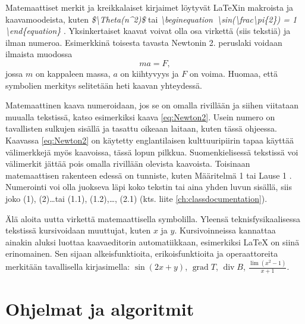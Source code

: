 \documentclass[globalnumbering,centeredcaptions,draftfooter]{tutthesis/tutthesis} %
\begin{document}
Matemaattiset merkit ja kreikkalaiset kirjaimet löytyvät LaTeXin makroista ja kaavamoodeista, kuten
\emph{\$\textbackslash Theta(n\textasciicircum2)\$}
tai
\emph{\textbackslash begin\textbraceleft equation\textbraceright\ \textbackslash sin(\textbackslash frac\textbraceleft \textbackslash pi\textbraceright\{2\}) = 1 \textbackslash end\{equation\}}
.
Yksinkertaiset kaavat voivat olla osa virkettä (siis tekstiä) ja ilman numeroa.
Esimerkkinä toisesta tavasta Newtonin 2. peruslaki voidaan ilmaista muodossa
\begin{equation} %
\label{eq:Newton2} ma = F,
\end{equation} %
jossa $m$ on kappaleen massa, $a$ on kiihtyvyys ja $F$ on voima.
Huomaa, että symbolien merkitys selitetään heti kaavan yhteydessä.


Matemaattinen kaava numeroidaan, jos se on omalla rivillään ja siihen viitataan muualla tekstissä, katso esimerkiksi kaava \eqref{eq:Newton2}.
Usein numero on tavallisten sulkujen sisällä ja tasattu oikeaan laitaan, kuten tässä ohjeessa.
Kaavassa \eqref{eq:Newton2} on käytetty englantilaisen kulttuuripiirin tapaa käyttää välimerkkejä myös kaavoissa, tässä lopun pilkkua.
Suomenkielisessä tekstissä voi välimerkit jättää pois omalla rivillään olevista kaavoista.
Toisinaan matemaattisen rakenteen edessä on tunniste, kuten Määritelmä 1 tai Lause 1 \citep{Ruohonen2009}.
Numerointi voi olla juokseva läpi koko tekstin tai aina yhden luvun sisällä, siis joko (1), (2)\ldots tai (1.1), (1.2),\ldots, (2.1) (kts. liite \ref{ch:classdocumentation}).

Älä aloita uutta virkettä matemaattisella symbolilla.
Yleensä teknisfysikaalisessa tekstissä kursivoidaan muuttujat, kuten $x$ ja $y$.
Kursivoinneissa kannattaa ainakin aluksi luottaa kaavaeditorin automatiikkaan, esimerkiksi LaTeX \citep{Oetiker2011} on siinä erinomainen.
Sen sijaan alkeisfunktioita, erikoisfunktioita ja operaattoreita merkitään tavallisella kirjasimella: $\sin (2x+y)$, $\operatorname{grad} T$, $\operatorname{div} B$, $\frac{\lim (x^2 - 1)}{x + 1}$.


\section{Ohjelmat ja algoritmit}
\end{document}
